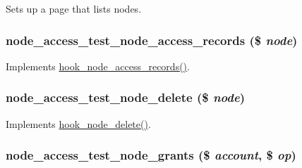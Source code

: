 Sets up a page that lists nodes. \hypertarget{node__access__test_8module_aaf057da77b2be1912eb8713f927533ca}{
\subsubsection[{node\_\-access\_\-test\_\-node\_\-access\_\-records}]{\setlength{\rightskip}{0pt plus 5cm}node\_\-access\_\-test\_\-node\_\-access\_\-records (\$ {\em node})}}
\label{node__access__test_8module_aaf057da77b2be1912eb8713f927533ca}
Implements \hyperlink{group__node__access_ga3fe7744d74446e40e9b9ad2a782b4269}{hook\_\-node\_\-access\_\-records()}. \hypertarget{node__access__test_8module_a45b4e169741404976907c0432c119f3a}{
\subsubsection[{node\_\-access\_\-test\_\-node\_\-delete}]{\setlength{\rightskip}{0pt plus 5cm}node\_\-access\_\-test\_\-node\_\-delete (\$ {\em node})}}
\label{node__access__test_8module_a45b4e169741404976907c0432c119f3a}
Implements \hyperlink{group__node__api__hooks_ga66ea0473a9950dc961802e801e5042e9}{hook\_\-node\_\-delete()}. \hypertarget{node__access__test_8module_ab786cb7574630a4c4573638f07456d24}{
\subsubsection[{node\_\-access\_\-test\_\-node\_\-grants}]{\setlength{\rightskip}{0pt plus 5cm}node\_\-access\_\-test\_\-node\_\-grants (\$ {\em account}, \/  \$ {\em op})}}
\label{node__access__test_8module_ab786cb7574630a4c4573638f07456d24}
